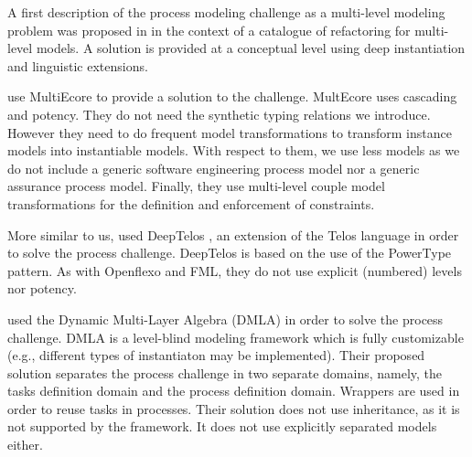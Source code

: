 

A first description of the process modeling challenge as a multi-level modeling problem was proposed in \cite{lara2018refactoring} in the context of a catalogue of refactoring for multi-level models. A solution is provided at a conceptual level using deep instantiation and linguistic extensions.

\cite{multiecore2019} use MultiEcore \citep{multecore2016} to provide a solution to the challenge. MultEcore uses cascading and potency. They do not need the synthetic typing relations we introduce. However they need to do frequent model transformations to transform instance models into instantiable models. With respect to them, we use less models as we do not include a generic software engineering process model nor a generic assurance process model. Finally, they use multi-level couple model transformations for the definition and enforcement of constraints.

More similar to us, \cite{deeptelos2019} used DeepTelos \citep{deeptelos2016}, an extension of the Telos language \citep{telos1990} in order to solve the process challenge. DeepTelos is based on the use of the PowerType \citep{atkinson2001essence} pattern. As with Openflexo and FML, they do not use explicit (numbered) levels nor potency.



\cite{dmla2019} used the Dynamic Multi-Layer Algebra (DMLA) \citep{dmla2017} in order to solve the process challenge. DMLA is a level-blind modeling framework which is fully customizable (e.g., different types of instantiaton may be implemented). Their proposed solution separates the process challenge in two separate domains, namely, the tasks definition domain and the process definition domain. Wrappers are used in order to reuse tasks in processes. Their solution does not use inheritance, as it is not supported by the framework. It does not use explicitly separated models either.


